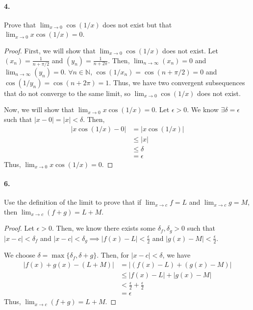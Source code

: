 \documentclass[12pt]{article}
\newcommand\N{\mathbb{N}}
\theoremstyle{remark}
\begin{document}
\paragraph{4.} Prove that $\lim_{x \to 0} \cos(1/x)$ does not exist but that $\lim_{x \to 0} x \cos(1/x) = 0$.
\begin{proof}
    First, we will show that $\lim_{x \to 0} \cos(1/x)$ does not exist. Let $(x_n) = \frac{1}{n + \pi/2}$ and $(y_n) = \frac{1}{n + 2\pi}$. Then, $\lim_{n \to \infty} (x_n) = 0$ and $\lim_{n \to \infty} (y_n) = 0$. $\forall n \in \N$, $\cos(1/x_n) = \cos(n + \pi/2) = 0$ and $\cos(1/y_n) = \cos(n + 2\pi) = 1$. Thus, we have two convergent subsequences that do not converge to the same limit, so $\lim_{x \to 0} \cos(1/x)$ does not exist.

    Now, we will show that $\lim_{x \to 0} x \cos(1/x) = 0$. Let $\epsilon > 0$. We know $\exists \delta = \epsilon$ such that $|x - 0| = |x| < \delta$. Then,
    \begin{align*}
        |x \cos(1/x) - 0| &= |x \cos(1/x)| \\
        &\leq |x| \\
        &\leq \delta \\
        &= \epsilon
    \end{align*}
    Thus, $\lim_{x \to 0} x \cos(1/x) = 0$.
\end{proof}

\paragraph{6.} Use the definition of the limit to prove that if $\lim_{x \to c} f = L$ and $\lim_{x \to c} g = M$, then $\lim_{x \to c} (f + g) = L + M$.
\begin{proof}
    Let $\epsilon > 0$. Then, we know there exists some $\delta_f, \delta_g > 0$ such that $|x - c| < \delta_f$ and $|x - c| < \delta_g \implies |f(x) - L| < \frac{\epsilon}{2}$ and $|g(x) - M| < \frac{\epsilon}{2}$.
    
    We choose $\delta = \max\{\delta_f, \delta+g\}$. Then, for $|x - c| < \delta$, we have
    \begin{align*}
        |f(x) + g(x) - (L + M)| &= |(f(x) - L) + (g(x) - M)| \\
        &\leq |f(x) - L| + |g(x) - M| \\
        &< \frac{\epsilon}{2} + \frac{\epsilon}{2} \\
        &= \epsilon
    \end{align*}
    Thus, $\lim_{x \to c} (f + g) = L + M$.
\end{proof}
\end{document}
